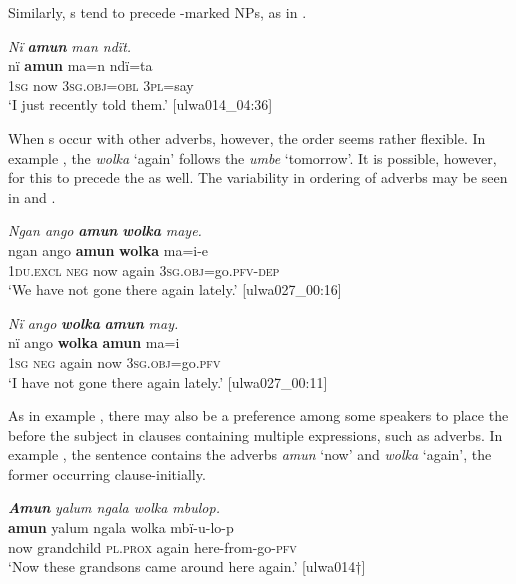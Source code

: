 Similarly, s tend to precede -marked NPs, as in .

\ea%
    \label{ex:otherwc:44}
          \textit{Nï} \textbf{\textit{amun}} \textit{man ndït.}\\
\gll    nï    \textbf{amun}  ma=n      ndï=ta\\
    1\textsc{sg}  now  3\textsc{sg.obj=obl}  3\textsc{pl}=say\\
\glt    ‘I just recently told them.’ [ulwa014\_04:36]
\z

When s occur with other adverbs, however, the order seems rather flexible. In example , the  \textit{wolka} ‘again’ follows the  \textit{umbe} ‘tomorrow’. It is possible, however, for this  to precede the  as well. The variability in ordering of adverbs may be seen in  and .



\ea%
    \label{ex:otherwc:45}
          \textit{Ngan ango} \textbf{\textit{amun}} \textbf{\textit{wolka}} \textit{maye.}\\
\gll    ngan    ango  \textbf{amun}  \textbf{wolka}  ma=i-e\\
    1\textsc{du.excl}  \textsc{neg}  now  again  3\textsc{sg.obj}=go.\textsc{pfv-dep}\\
\glt `We have not gone there again lately.’ [ulwa027\_00:16]
\z

\ea%
    \label{ex:otherwc:46}
          \textit{Nï ango} \textbf{\textit{wolka}} \textbf{\textit{amun}} \textit{may.}\\
\gll    nï    ango  \textbf{wolka}  \textbf{amun}  ma=i\\
    1\textsc{sg}  \textsc{neg}  again  now  3\textsc{sg.obj}=go.\textsc{pfv}\\
\glt `I have not gone there again lately.’ [ulwa027\_00:11]
\z

As in example , there may also be a preference among some speakers to place the  before the subject in clauses containing multiple  expressions, such as adverbs. In example , the sentence contains the adverbs \textit{amun} ‘now’ and \textit{wolka} ‘again’, the former occurring clause-initially.

\ea%
    \label{ex:otherwc:47}
          \textbf{\textit{Amun}} \textit{yalum ngala wolka mbulop.}\\
\gll    \textbf{amun}  yalum    ngala    wolka  mbï-u-lo-p\\
    now  grandchild  \textsc{pl.prox}  again  here-from-go-\textsc{pfv}\\
\glt `Now these grandsons came around here again.’ [ulwa014†]
\z

